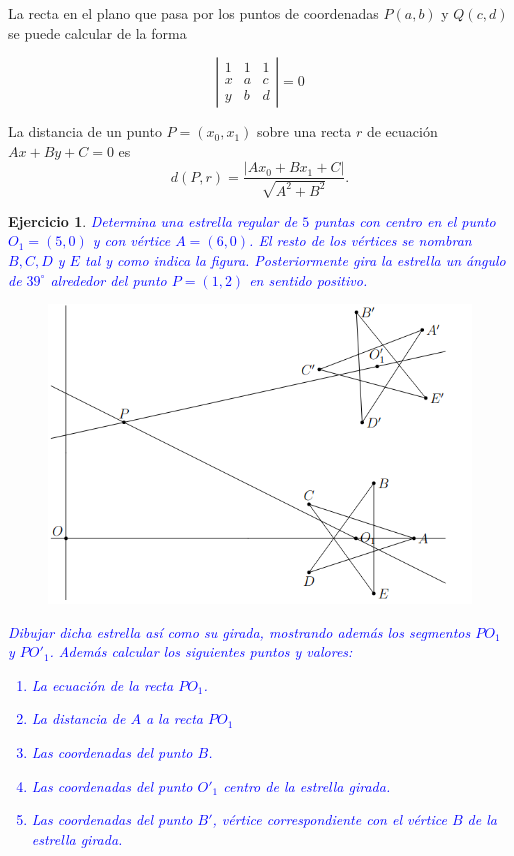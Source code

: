 \documentclass{amsart}
\newtheorem{ejer}{Ejercicio}
\begin{document}

\newpage

\begin{tcolorbox}[colback = orange!60!white,title = Cuestiones teóricas previas]
La recta en el plano que pasa por los puntos de coordenadas $P(a,b)$ y $Q(c,d)$ se puede calcular de la forma

\[ \left| \begin{array}{rrr}
1 & 1 & 1  \\            
x & a & c  \\          
y & b & d            
\end{array} \right| = 0\]

La distancia de un punto $P=(x_0,x_1)$ sobre una recta $r$ de ecuación $Ax+By+C = 0$ es
\[ d(P,r) = \frac{\vert Ax_0+Bx_1+C\vert}{\sqrt{A^2+B^2}}. \] 
\end{tcolorbox}

\begin{ejer}
\textcolor{blue}{Determina una estrella regular de $5$ puntas con centro en el punto $O_1 = (5,0)$ y con vértice $A = (6,0)$. El resto de los vértices se nombran $B, C, D$ y $E$ tal y como indica la figura. Posteriormente gira la estrella un ángulo de $39^\circ $ alrededor del punto $P = (1,2)$ en sentido positivo.}

\begin{figure}[H]
\centering
\includegraphics[width = 12cm]{estrella1.png}
\end{figure}

\textcolor{blue}{Dibujar dicha estrella así como su girada, mostrando además los segmentos $PO_1$ y $PO'_1$. Además calcular los siguientes puntos y valores:
\begin{enumerate} 
\item[a)] La ecuación de la recta $PO_1$.
\item[b)] La distancia de $A$ a la recta $PO_1$
\item[c)] Las coordenadas del punto $B$.
\item[d)] Las coordenadas del punto $O'_1$ centro de la estrella girada.
\item[e)] Las coordenadas del punto $B'$, vértice correspondiente con el vértice $B$ de la estrella girada.
\end{enumerate}}

\end{ejer}
\end{document}
